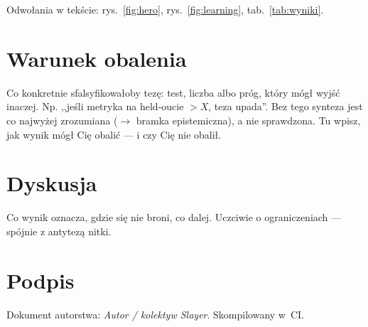 Odwołania w tekście: rys.~\ref{fig:hero}, rys.~\ref{fig:learning}, tab.~\ref{tab:wyniki}.

\section{Warunek obalenia}
Co konkretnie sfalsyfikowałoby tezę: test, liczba albo próg, który mógł wyjść
inaczej. Np. ,,jeśli metryka na held-oucie $>X$, teza upada''. Bez tego synteza
jest co najwyżej zrozumiana ($\to$ bramka epistemiczna), a nie sprawdzona.
Tu wpisz, jak wynik mógł Cię obalić --- i czy Cię nie obalił.

\section{Dyskusja}
Co wynik oznacza, gdzie się nie broni, co dalej. Uczciwie o ograniczeniach
--- spójnie z antytezą nitki.

\section*{Podpis}
Dokument autorstwa: \emph{Autor / kolektyw Slayer}. Skompilowany w~CI.
